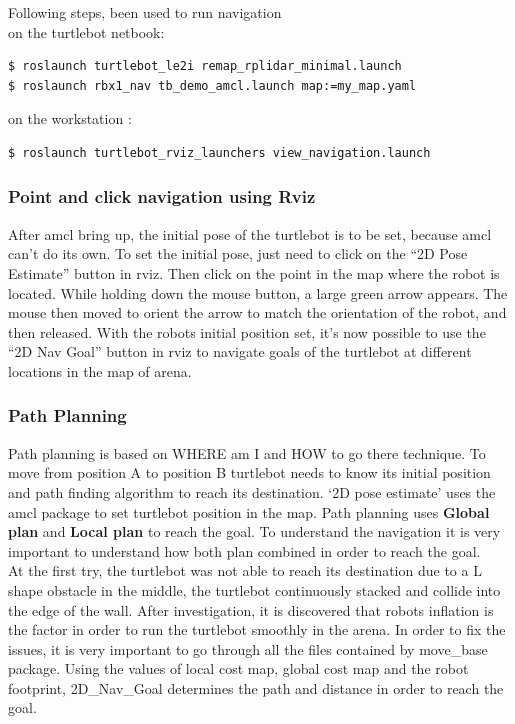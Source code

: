 \documentclass[10pt,a4paper]{article}
\begin{document}
Following steps, been used to run navigation \\
on the turtlebot netbook:
\begin{lstlisting}[frame=single]
$ roslaunch turtlebot_le2i remap_rplidar_minimal.launch
$ roslaunch rbx1_nav tb_demo_amcl.launch map:=my_map.yaml
\end{lstlisting}

on the workstation : 
\begin{lstlisting}[frame=single]
$ roslaunch turtlebot_rviz_launchers view_navigation.launch
\end{lstlisting}

\subsubsection{Point and click navigation using Rviz}
After amcl bring up, the initial pose of the turtlebot is to be set, because amcl can’t do its own. To set the initial pose, just need to click on the “2D Pose Estimate” button in rviz. Then click on the point in the map where the robot is located. While holding down the mouse button, a large green arrow appears. The mouse then moved to orient the arrow to match the orientation of the robot, and then released. With the robots initial position set, it’s now possible to use the “2D Nav Goal” button in rviz to navigate goals of the turtlebot at different locations in the map of arena.\\

\subsubsection{Path Planning}
Path planning is based on WHERE am I and HOW to go there technique. To move from position A to position B turtlebot needs to know its initial position and path finding algorithm to reach its destination. ‘2D pose estimate’ uses the amcl package to set turtlebot position in the map. Path planning uses \textbf{Global plan} and \textbf{Local plan} to reach the goal. To understand the navigation it is very important to understand how both plan combined in order to reach the goal. \\

At the first try, the turtlebot was not able to reach its destination due to a L shape obstacle in the middle, the turtlebot continuously stacked and collide into the edge of the wall. After investigation, it is discovered that robots inflation is the factor in order to run the turtlebot smoothly in the arena. In order to fix the issues, it is very important to go through all the files contained by move\_base package. Using the values of local cost map, global cost map and the robot footprint, 2D\_Nav\_Goal determines the path and distance in order to reach the goal. \\
\end{document}
